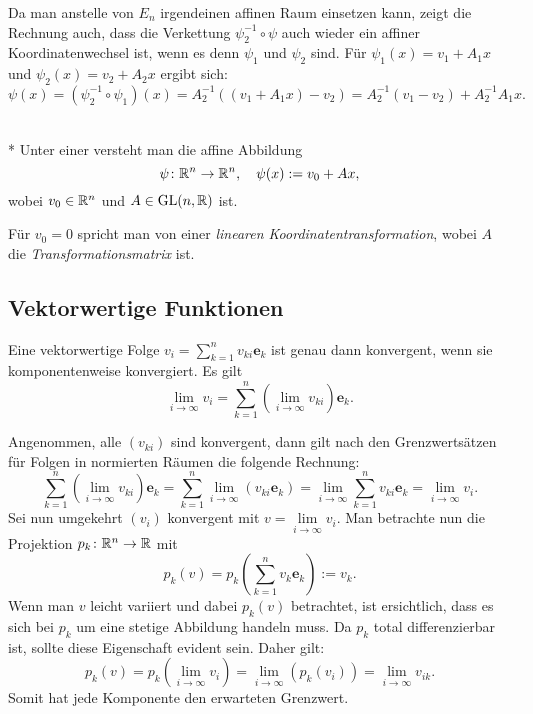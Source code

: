 Da man anstelle von $E_n$ irgendeinen affinen Raum einsetzen kann,
zeigt die Rechnung auch, dass die Verkettung $\psi_2^{-1}\circ\psi$
auch wieder ein affiner Koordinatenwechsel ist, wenn es denn $\psi_1$
und $\psi_2$ sind. Für $\psi_1(x)=v_1+A_1 x$ und
$\psi_2(x) = v_2+A_2 x$
ergibt sich:%
\begin{equation}
\psi(x) = (\psi_2^{-1}\circ\psi_1)(x)
= A_2^{-1}((v_1+A_1x)-v_2)
= A_2^{-1}(v_1-v_2) + A_2^{-1} A_1 x.
\end{equation}

\begin{definition}%
\mbox{}\\*
Unter einer  versteht man
die affine Abbildung
\begin{equation}
\psi\colon\mathbb R^n\to\mathbb R^n,\quad \psi(x):=v_0+Ax,
\end{equation}
wobei $v_0\in\mathbb R^n$ und $A\in\operatorname{GL}(n,\mathbb R)$ ist.
\end{definition}
Für $v_0=0$ spricht man von einer \emph{linearen
Koordinatentransformation}, wobei $A$ die \emph{Transformationsmatrix}
ist.

\subsection{Vektorwertige Funktionen}
\begin{theorem}\label{lim-vektorwertige-Folge}
Eine vektorwertige Folge $v_i = \sum_{k=1}^n v_{ki}\mathbf e_k$
ist genau dann konvergent, wenn sie komponentenweise konvergiert.
Es gilt
\begin{equation}
\lim_{i\to\infty} v_i
= \sum_{k=1}^n (\lim_{i\to\infty} v_{ki})\mathbf e_k.
\end{equation}
\end{theorem}
 Angenommen, alle $(v_{ki})$ sind konvergent, dann gilt
nach den Grenzwertsätzen für Folgen in normierten Räumen die folgende
Rechnung:
\begin{equation}
\sum_{k=1}^n (\lim_{i\to\infty} v_{ki})\mathbf e_k
= \sum_{k=1}^n \lim_{i\to\infty} (v_{ki}\mathbf e_k)
= \lim_{i\to\infty}\sum_{k=1}^n v_{ki}\mathbf e_k = \lim_{i\to\infty} v_i.
\end{equation}
Sei nun umgekehrt $(v_i)$ konvergent mit $v = \lim\limits_{i\to\infty} v_i$.
Man betrachte nun die Projektion $p_k\colon\mathbb R^n\to\mathbb R$ mit
\begin{equation}
p_k(v) = p_k(\sum_{k=1}^n v_k\mathbf e_k) := v_k.
\end{equation}
Wenn man $v$ leicht variiert und dabei $p_k(v)$ betrachtet, ist
ersichtlich, dass es sich bei $p_k$ um eine stetige Abbildung handeln
muss. Da $p_k$ total differenzierbar ist, sollte diese Eigenschaft
evident sein. Daher gilt:
\begin{equation}
p_k(v) = p_k(\lim_{i\to\infty} v_i) = \lim_{i\to\infty}(p_k(v_i))
= \lim_{i\to\infty} v_{ik}.
\end{equation}
Somit hat jede Komponente den erwarteten Grenzwert.\;\qedsymbol

